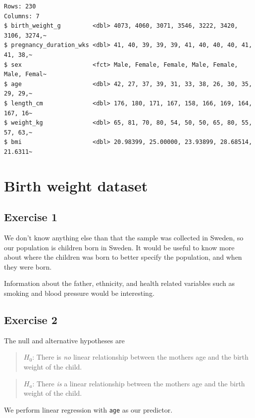\documentclass[
  letterpaper,
  DIV=11,
  numbers=noendperiod]{scrreprt}
\begin{document}
\begin{verbatim}
Rows: 230
Columns: 7
$ birth_weight_g         <dbl> 4073, 4060, 3071, 3546, 3222, 3420, 3106, 3274,~
$ pregnancy_duration_wks <dbl> 41, 40, 39, 39, 39, 41, 40, 40, 40, 41, 41, 38,~
$ sex                    <fct> Male, Female, Female, Male, Female, Male, Femal~
$ age                    <dbl> 42, 27, 37, 39, 31, 33, 38, 26, 30, 35, 29, 29,~
$ length_cm              <dbl> 176, 180, 171, 167, 158, 166, 169, 164, 167, 16~
$ weight_kg              <dbl> 65, 81, 70, 80, 54, 50, 50, 65, 80, 55, 57, 63,~
$ bmi                    <dbl> 20.98399, 25.00000, 23.93899, 28.68514, 21.6311~
\end{verbatim}

\section{Birth weight dataset}\label{birth-weight-dataset-1}

\subsection{Exercise 1}\label{exercise-1-26}

We don't know anything else than that the sample was collected in
Sweden, so our population is children born in Sweden. It would be useful
to know more about where the children was born to better specify the
population, and when they were born.

Information about the father, ethnicity, and health related variables
such as smoking and blood pressure would be interesting.

\subsection{Exercise 2}\label{exercise-2-23}

The null and alternative hypotheses are

\begin{quote}
\textbf{\(H_0\)}: There is \emph{no} linear relationship between the
mothers age and the birth weight of the child.
\end{quote}

\begin{quote}
\textbf{\(H_a\)}: There \emph{is} a linear relationship between the
mothers age and the birth weight of the child.
\end{quote}

We perform linear regression with \texttt{age} as our predictor.
\end{document}
